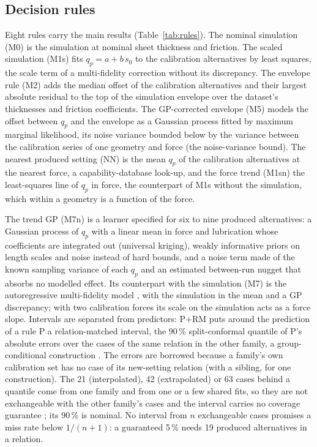 \documentclass[pdflatex,sn-basic,lineno]{sn-jnl}
\begin{document}
\subsection{Decision rules}\label{sec:rules}

Eight rules carry the main results (Table~\ref{tab:rules}). The nominal simulation (M0) is the simulation at nominal sheet thickness and friction. The scaled simulation (M1s) fits $q_p = a + b\,s_0$ to the calibration alternatives by least squares, the scale term of a multi-fidelity correction without its discrepancy. The envelope rule (M2) adds the median offset of the calibration alternatives and their largest absolute residual to the top of the simulation envelope over the dataset's thicknesses and friction coefficients. The GP-corrected envelope (M5) models the offset between $q_p$ and the envelope as a Gaussian process \citep{rasmussen2006gaussian} fitted by maximum marginal likelihood, its noise variance bounded below by the variance between the calibration series of one geometry and force (the noise-variance bound). The nearest produced setting (NN) is the mean $q_p$ of the calibration alternatives at the nearest force, a capability-database look-up, and the force trend (M1sn) the least-squares line of $q_p$ in force, the counterpart of M1s without the simulation, which within a geometry is a function of the force.

The trend GP (M7n) is a learner specified for six to nine produced alternatives: a Gaussian process of $q_p$ with a linear mean in force and lubrication whose coefficients are integrated out (universal kriging), weakly informative priors on length scales and noise instead of hard bounds, and a noise term made of the known sampling variance of each $q_p$ and an estimated between-run nugget that absorbs no modelled effect. Its counterpart with the simulation (M7) is the autoregressive multi-fidelity model \citep{kennedy2000predicting}, with the simulation in the mean and a GP discrepancy; with two calibration forces its scale on the simulation acts as a force slope. Intervals are separated from predictors: P+RM puts around the prediction of a rule P a relation-matched interval, the 90\,\% split-conformal quantile \citep{lei2018distribution} of P's absolute errors over the cases of the same relation in the other family, a group-conditional construction \citep{vovk2005algorithmic}. The errors are borrowed because a family's own calibration set has no case of its new-setting relation (with a sibling, for one construction). The 21 (interpolated), 42 (extrapolated) or 63 cases behind a quantile come from one family and from one or a few shared fits, so they are not exchangeable with the other family's cases and the interval carries no coverage guarantee \citep{barber2023conformal}; its 90\,\% is nominal. No interval from $n$ exchangeable cases promises a miss rate below $1/(n+1)$: a guaranteed 5\,\% needs 19 produced alternatives in a relation.
\end{document}
